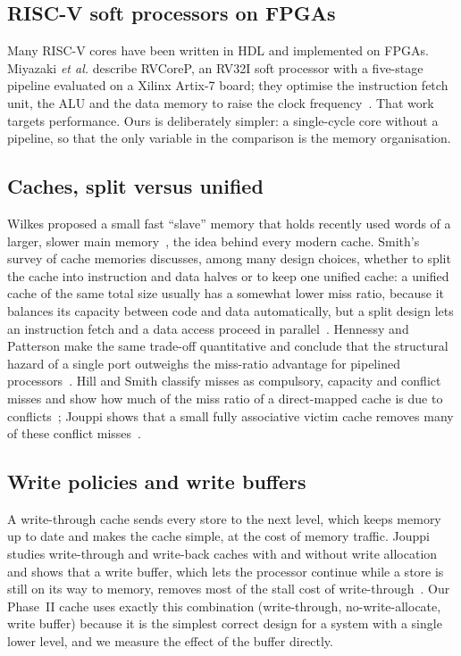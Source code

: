 \documentclass[conference]{IEEEtran}
\begin{document}
\subsection{RISC-V soft processors on FPGAs}
Many RISC-V cores have been written in HDL and implemented on FPGAs.
Miyazaki \emph{et al.} describe RVCoreP, an RV32I soft processor with a
five-stage pipeline evaluated on a Xilinx Artix-7 board; they optimise the
instruction fetch unit, the ALU and the data memory to raise the clock
frequency~\cite{miyazaki2020rvcorep}. That work targets performance. Ours is
deliberately simpler: a single-cycle core without a pipeline, so that the
only variable in the comparison is the memory organisation.

\subsection{Caches, split versus unified}
Wilkes proposed a small fast ``slave'' memory that holds recently used words
of a larger, slower main memory~\cite{wilkes1965}, the idea behind every
modern cache. Smith's survey of cache memories discusses, among many design
choices, whether to split the cache into instruction and data halves or to
keep one unified cache: a unified cache of the same total size usually has a
somewhat lower miss ratio, because it balances its capacity between code and
data automatically, but a split design lets an instruction fetch and a data
access proceed in parallel~\cite{smith1982}. Hennessy and Patterson make the
same trade-off quantitative and conclude that the structural hazard of a
single port outweighs the miss-ratio advantage for pipelined
processors~\cite{hennessy_quant}. Hill and Smith classify misses as
compulsory, capacity and conflict misses and show how much of the miss ratio
of a direct-mapped cache is due to conflicts~\cite{hill1989}; Jouppi shows
that a small fully associative victim cache removes many of these conflict
misses~\cite{jouppi1990}.

\subsection{Write policies and write buffers}
A write-through cache sends every store to the next level, which keeps
memory up to date and makes the cache simple, at the cost of memory
traffic. Jouppi studies write-through and write-back caches with and without
write allocation and shows that a write buffer, which lets the processor
continue while a store is still on its way to memory, removes most of the
stall cost of write-through~\cite{jouppi1993}. Our Phase~II cache uses
exactly this combination (write-through, no-write-allocate, write buffer)
because it is the simplest correct design for a system with a single lower
level, and we measure the effect of the buffer directly.
\end{document}
